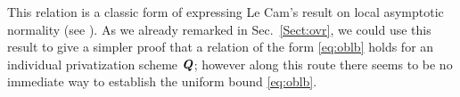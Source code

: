 \documentclass[11pt,onecolumn]{IEEEtran}
\newcounter{remark}[section]
\def\mathbi#1{{\textbf{\textit #1}}}
\begin{document}
This relation is a classic form of expressing Le Cam's result on local asymptotic normality (see \cite[Chapter 2, Theorem 1.1]{Ibrag81}).
As we already remarked in Sec.~\ref{Sect:ovr}, we could use this result to give a simpler proof that a relation of the form \eqref{eq:oblb} holds for an individual privatization scheme $\mathbi Q$; however along this route there seems to be no immediate way to establish the uniform bound
\eqref{eq:oblb}.



\end{document}
